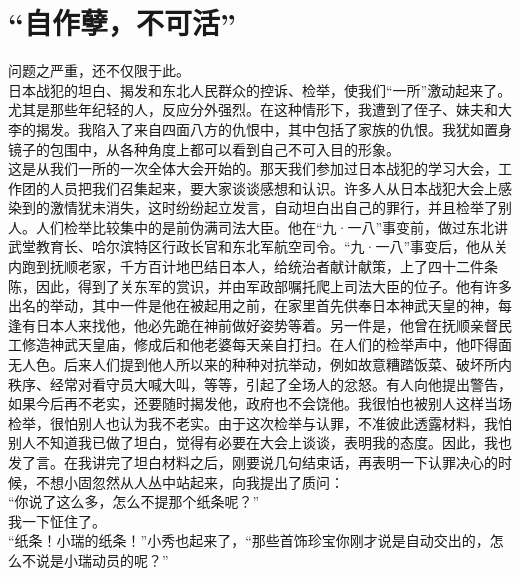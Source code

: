 \fancyhead[RO]{} %
\fancyhead[LE]{} %
\chapter*{“自作孽，不可活”}
\thispagestyle{empty}
问题之严重，还不仅限于此。\\

日本战犯的坦白、揭发和东北人民群众的控诉、检举，使我们“一所”激动起来了。尤其是那些年纪轻的人，反应分外强烈。在这种情形下，我遭到了侄子、妹夫和大李的揭发。我陷入了来自四面八方的仇恨中，其中包括了家族的仇恨。我犹如置身镜子的包围中，从各种角度上都可以看到自己不可入目的形象。\\

这是从我们一所的一次全体大会开始的。那天我们参加过日本战犯的学习大会，工作团的人员把我们召集起来，要大家谈谈感想和认识。许多人从日本战犯大会上感染到的激情犹未消失，这时纷纷起立发言，自动坦白出自己的罪行，并且检举了别人。人们检举比较集中的是前伪满司法大臣。他在“九·一八”事变前，做过东北讲武堂教育长、哈尔滨特区行政长官和东北军航空司令。“九·一八”事变后，他从关内跑到抚顺老家，千方百计地巴结日本人，给统治者献计献策，上了四十二件条陈，因此，得到了关东军的赏识，并由军政部嘱托爬上司法大臣的位子。他有许多出名的举动，其中一件是他在被起用之前，在家里首先供奉日本神武天皇的神，每逢有日本人来找他，他必先跪在神前做好姿势等着。另一件是，他曾在抚顺亲督民工修造神武天皇庙，修成后和他老婆每天亲自打扫。在人们的检举声中，他吓得面无人色。后来人们提到他人所以来的种种对抗举动，例如故意糟踏饭菜、破坏所内秩序、经常对看守员大喊大叫，等等，引起了全场人的忿怒。有人向他提出警告，如果今后再不老实，还要随时揭发他，政府也不会饶他。我很怕也被别人这样当场检举，很怕别人也认为我不老实。由于这次检举与认罪，不准彼此透露材料，我怕别人不知道我已做了坦白，觉得有必要在大会上谈谈，表明我的态度。因此，我也发了言。在我讲完了坦白材料之后，刚要说几句结束话，再表明一下认罪决心的时候，不想小固忽然从人丛中站起来，向我提出了质问：\\

“你说了这么多，怎么不提那个纸条呢？”\\

我一下怔住了。\\

“纸条！小瑞的纸条！”小秀也起来了，“那些首饰珍宝你刚才说是自动交出的，怎么不说是小瑞动员的呢？”\\

